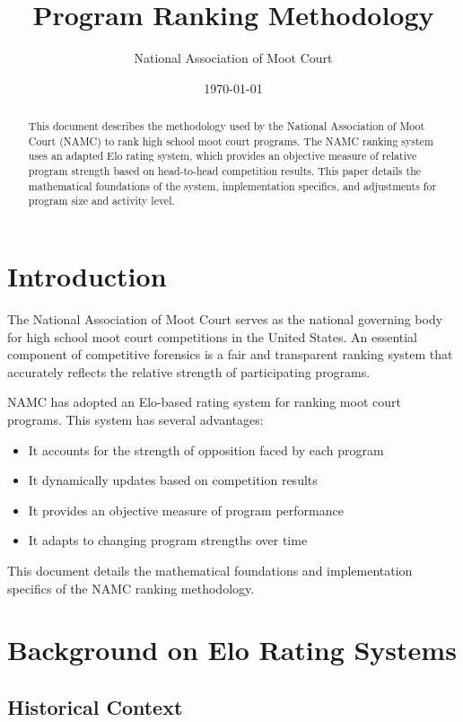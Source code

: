 \documentclass[11pt]{article}
\title{Program Ranking Methodology}
\author{National Association of Moot Court}
\date{\today}
\begin{document}
\maketitle

\begin{abstract}
This document describes the methodology used by the National Association of Moot Court (NAMC) to rank high school moot court programs. The NAMC ranking system uses an adapted Elo rating system, which provides an objective measure of relative program strength based on head-to-head competition results. This paper details the mathematical foundations of the system, implementation specifics, and adjustments for program size and activity level.
\end{abstract}

\section{Introduction}

The National Association of Moot Court serves as the national governing body for high school moot court competitions in the United States. An essential component of competitive forensics is a fair and transparent ranking system that accurately reflects the relative strength of participating programs.

NAMC has adopted an Elo-based rating system for ranking moot court programs. This system has several advantages:

\begin{itemize}
    \item It accounts for the strength of opposition faced by each program
    \item It dynamically updates based on competition results
    \item It provides an objective measure of program performance
    \item It adapts to changing program strengths over time
\end{itemize}

This document details the mathematical foundations and implementation specifics of the NAMC ranking methodology.

\section{Background on Elo Rating Systems}

\subsection{Historical Context}
\end{document}
